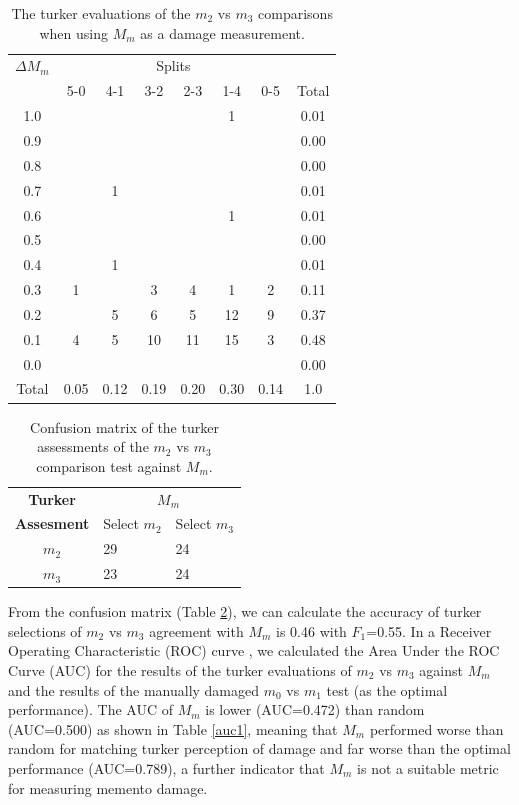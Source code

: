 \begin{table}
\begin{tabular}{ c | c | c | c | c | c | c || c}
    {$\Delta M_m$} &  \multicolumn{6}{c}{Splits}\\
  & 5-0 & 4-1 & 3-2 & 2-3 & 1-4 & 0-5 & Total\\
\hline
1.0 &  &  &  &  & 1 & & 0.01\\
0.9 &  &  &  &  &  & & 0.00\\
0.8 &  &  &  &  &  & & 0.00\\
0.7 &  & 1 &  &  &  & & 0.01\\
0.6 &  &  &  &  & 1 & & 0.01\\
0.5 &  &  &  &  &  & & 0.00\\
0.4 &  & 1 &  &  &  & & 0.01\\
0.3 & 1 &  & 3 & 4 & 1 & 2& 0.11\\
0.2 &  & 5 & 6 & 5 & 12 & 9& 0.37\\
0.1 & 4 & 5 & 10 & 11 & 15 & 3& 0.48\\
0.0 &  &  &  &  &  & & 0.00\\
\hline
Total & 0.05 & 0.12 & 0.19 & 0.20 & 0.30 & 0.14 & 1.0
\end{tabular}
  \caption{The turker evaluations of the $m_2$ vs $m_3$ comparisons when using $M_m$ as a damage measurement.}
  \label{m1table}
\end{table}

\begin{table}
\centering
\begin{tabular}{cll}
\textbf{Turker} & \multicolumn{2}{c}{ \textbf{ $M_{m}$}}                           \\
\textbf{Assesment}                  &          Select $m_{2}$             &           Select $m_{3}$             \\ \cline{2-3} 
       $m_{2}$           & \multicolumn{1}{|l}{29} & \multicolumn{1}{|l|}{24} \\ \cline{2-3} 
       $m_{3}$           & \multicolumn{1}{|l}{23} & \multicolumn{1}{|l|}{24} \\ \cline{2-3} 
\end{tabular}
  \caption{Confusion matrix of the turker assessments of the $m_2$ vs $m_3$ comparison test against $M_m$.}
  \label{m1cm}
\end{table}



From the confusion matrix (Table \ref{m1cm}), we can calculate the accuracy of turker selections of $m_2$ vs $m_3$ agreement with $M_m$ is 0.46 with $F_1$=0.55. In a Receiver Operating Characteristic (ROC) curve \cite{fawcett2006introduction}, we calculated the Area Under the ROC Curve (AUC) for the results of the turker evaluations of $m_2$ vs $m_3$ against $M_m$ and the results of the manually damaged $m_0$ vs $m_1$ test (as the optimal performance). The AUC of $M_m$ is lower (AUC=0.472) than random (AUC=0.500) as shown in Table \ref{auc1}, meaning that $M_m$ performed worse than random for matching turker perception of damage and far worse than the optimal performance (AUC=0.789), a further indicator that $M_m$ is not a suitable metric for measuring memento damage.


